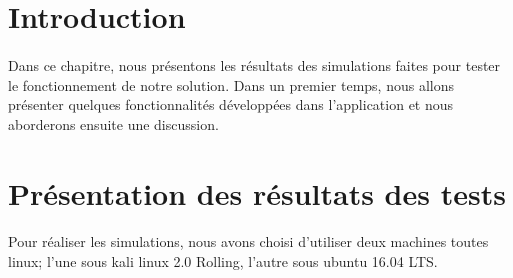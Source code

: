 \section*{Introduction}
		\paragraph{}
		Dans ce chapitre, nous présentons les résultats des simulations faites pour tester
		le fonctionnement de notre solution. Dans un premier temps, nous allons présenter quelques fonctionnalités développées dans l’application et nous aborderons ensuite une discussion.
		
		
		\section{Présentation des résultats des tests}
			\paragraph{}
				Pour réaliser les simulations, nous avons choisi d'utiliser deux machines toutes linux; l'une sous kali linux 2.0 Rolling, l'autre sous ubuntu 16.04 LTS. 
